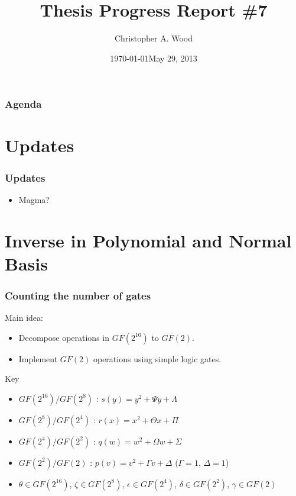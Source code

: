 \documentclass[handout]{beamer}
\title[Thesis Progress Report \#7]{Thesis Progress Report \#7}
\institute[RIT]{}
\date{\today}
\author{Christopher A. Wood}
\date{May 29, 2013}
\begin{document}

\begin{frame}
	\titlepage
\end{frame}

\begin{frame}
	\frametitle{Agenda}
	\tableofcontents
\end{frame}

\section{Updates}
\begin{frame}
	\frametitle{Updates}
	\begin{itemize}
		\item Magma?
	\end{itemize}
\end{frame}

\section{Inverse in Polynomial and Normal Basis}
\begin{frame}
	\frametitle{Counting the number of gates}
	Main idea:
	\begin{itemize}
		\item Decompose operations in $GF(2^{16})$ to $GF(2)$.
		\item Implement $GF(2)$ operations using simple logic gates.
	\end{itemize}

	\medskip

	Key
	\begin{itemize}
		\item $GF(2^{16})/GF(2^8)$ : $s(y) = y^2 + \Psi y + \Lambda$
		\item $GF(2^8)/GF(2^4)$ : $r(x) = x^2 + \Theta x + \Pi$
		\item $GF(2^4) / GF(2^2)$ : $q(w) = w^2 + \Omega w + \Sigma$
		\item $GF(2^2) / GF(2)$ : $p(v) = v^2 + \Gamma v + \Delta$ ($\Gamma = 1$, $\Delta = 1$)
		\item $\theta \in GF(2^{16})$, $\zeta \in GF(2^8)$, $\epsilon \in GF(2^4)$, $\delta \in GF(2^2)$, $\gamma \in GF(2)$
	\end{itemize}
\begin{figure}
\end{figure}
\end{frame}
\end{document}
